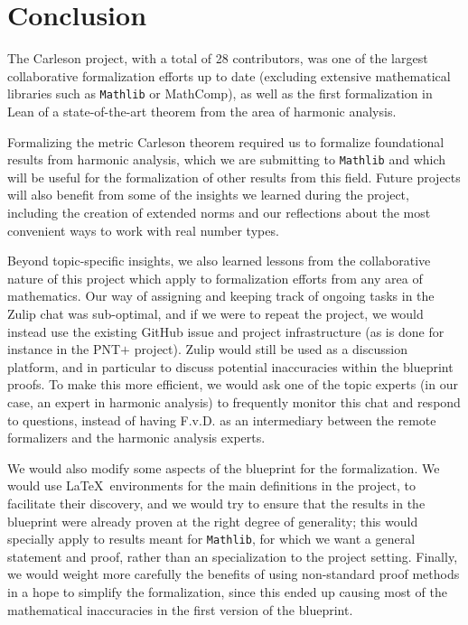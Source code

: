 \documentclass[12pt]{amsart}
\newcommand{\mathlib}{\texttt{Mathlib}\xspace}
\theoremstyle{definition}
\theoremstyle{plain}
\begin{document}
\section{Conclusion}\label{sec:conclusion}


The Carleson project, with a total of 28 contributors,
was one of the largest collaborative formalization efforts up to date
(excluding extensive mathematical libraries such as \mathlib or MathComp),
as well as the first formalization in Lean of a state-of-the-art theorem
from the area of harmonic analysis.

Formalizing the metric Carleson theorem required us
to formalize foundational results from harmonic analysis,
which we are submitting to \mathlib
and which will be useful for the formalization of other results from this field.
Future projects will also benefit from some of the insights we learned during the project,
including the creation of extended norms
and our reflections about the most convenient ways to work with real number types.

Beyond topic-specific insights,
we also learned lessons from the collaborative nature of this project
which apply to formalization efforts from any area of mathematics.
Our way of assigning and keeping track of ongoing tasks in the Zulip chat was sub-optimal,
and if we were to repeat the project,
we would instead use the existing GitHub issue and project infrastructure (as is done for instance in the PNT$+$ project).
Zulip would still be used as a discussion platform,
and in particular to discuss potential inaccuracies within the blueprint proofs.
To make this more efficient, we would ask one of the topic experts
(in our case, an expert in harmonic analysis)
to frequently monitor this chat and respond to questions,
instead of having F.v.D. as an intermediary between the remote formalizers and the harmonic analysis experts.

We would also modify some aspects of the blueprint for the formalization.
We would use \LaTeX\ environments for the main definitions in the project,
to facilitate their discovery,
and we would try to ensure that the results in the blueprint were already proven at the right degree of generality;
this would specially apply to results meant for \mathlib, for which we want a general statement and proof,
rather than an specialization to the project setting.
Finally, we would weight more carefully the benefits of using non-standard proof methods
in a hope to simplify the formalization,
since this ended up causing most of the mathematical inaccuracies in the first version of the blueprint.
\end{document}
